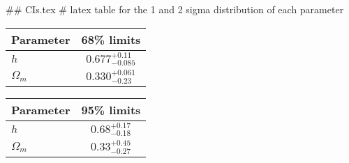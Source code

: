 ## CIs.tex
# latex table for the 1 and 2 sigma distribution of each parameter

\begin{tabular} { l  c}
 Parameter &  68\% limits\\
\hline
{\boldmath$h              $} & $0.677^{+0.11}_{-0.085}    $\\
{\boldmath$\Omega_m       $} & $0.330^{+0.061}_{-0.23}    $\\
\hline
\end{tabular}

\begin{tabular} { l  c}
 Parameter &  95\% limits\\
\hline
{\boldmath$h              $} & $0.68^{+0.17}_{-0.18}      $\\
{\boldmath$\Omega_m       $} & $0.33^{+0.45}_{-0.27}      $\\
\hline
\end{tabular}
